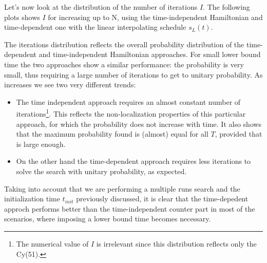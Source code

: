         \noindent
        Let's now look at the distribution of the number of iterations $I$. The following plots shows $I$ for increasing \tmin up to N, using the time-independent Hamiltonian and time-dependent one with the linear interpolating schedule $s_L(t)$.


        The iterations distribution reflects the overall probability distribution of the time-dependent and time-independent Hamiltonian approaches. For small lower bound time the two approaches show a similar performance: the probability is very small, thus requiring a large number of iterations to get to unitary probability. As \tmin increases we see two very different trends:
        \begin{itemize}
            \item The time independent approach requires an almost constant number of iterations\footnote{The numerical value of $I$ is irrelevant since this distribution reflects only the Cy(51).}. This reflects the non-localization properties of this particular approach, for which the probability does not increase with time. It also shows that the maximum probability found is (almost) equal for all $T$, provided that \tmin is large enough.
            \item On the other hand the time-dependent approach requires less iterations to solve the search with unitary probability, as expected.
        \end{itemize}
        Taking into account that we are performing a multiple runs search and the initialization time $t_{init}$ previously discussed, it is clear that the time-depedent approch performs better than the time-independent counter part in most of the scenarios, where imposing a lower bound time \tmin becomes necessary.



